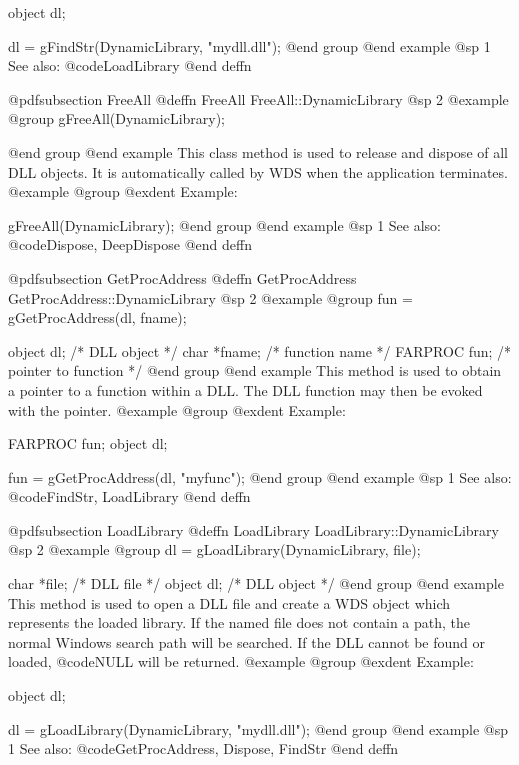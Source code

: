 object  dl;

dl = gFindStr(DynamicLibrary, "mydll.dll");
@end group
@end example
@sp 1
See also:  @code{LoadLibrary}
@end deffn










@pdfsubsection {FreeAll}
@deffn {FreeAll} FreeAll::DynamicLibrary
@sp 2
@example
@group
gFreeAll(DynamicLibrary);

@end group
@end example
This class method is used to release and dispose of all DLL objects.
It is automatically called by WDS when the application terminates.
@example
@group
@exdent Example:

gFreeAll(DynamicLibrary);
@end group
@end example
@sp 1
See also:  @code{Dispose, DeepDispose}
@end deffn











@pdfsubsection {GetProcAddress}
@deffn {GetProcAddress} GetProcAddress::DynamicLibrary
@sp 2
@example
@group
fun = gGetProcAddress(dl, fname);

object  dl;     /*  DLL object           */
char    *fname; /*  function name        */
FARPROC fun;    /*  pointer to function  */
@end group
@end example
This method is used to obtain a pointer to a function within a
DLL.  The DLL function may then be evoked with the pointer.
@example
@group
@exdent Example:

FARPROC fun;
object  dl;

fun = gGetProcAddress(dl, "myfunc");
@end group
@end example
@sp 1
See also:  @code{FindStr, LoadLibrary}
@end deffn










@pdfsubsection {LoadLibrary}
@deffn {LoadLibrary} LoadLibrary::DynamicLibrary
@sp 2
@example
@group
dl = gLoadLibrary(DynamicLibrary, file);

char    *file;  /*  DLL file    */
object  dl;     /*  DLL object  */
@end group
@end example
This method is used to open a DLL file and create a WDS object which
represents the loaded library.  If the named file does not contain a
path, the normal Windows search path will be searched.  If the
DLL cannot be found or loaded, @code{NULL} will be returned.
@example
@group
@exdent Example:

object  dl;

dl = gLoadLibrary(DynamicLibrary, "mydll.dll");
@end group
@end example
@sp 1
See also:  @code{GetProcAddress, Dispose, FindStr}
@end deffn








